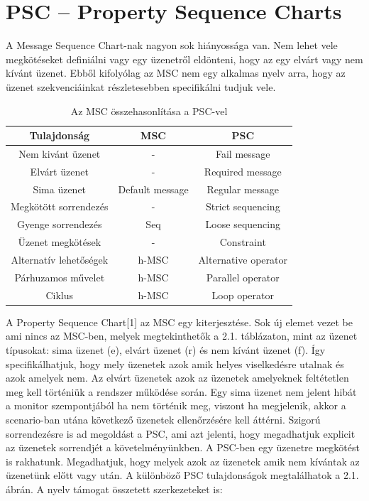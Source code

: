 \chapter{PSC – Property Sequence Charts}
A Message Sequence Chart-nak nagyon sok hiányossága van.
Nem lehet vele megkötéseket definiálni vagy egy üzenetről eldönteni, hogy az egy elvárt vagy nem kívánt üzenet.
Ebből kifolyólag az MSC nem egy alkalmas nyelv arra, hogy az üzenet szekvenciáinkat részletesebben specifikálni tudjuk vele.

\begin{table}[ht]
    \centering %
    \begin{tabular}{ |c|c|c| } %
    \hline
    \textbf{Tulajdonság} & \textbf{MSC} & \textbf{PSC} \\ [0.5ex] %
    \hline %
    \hline
    Nem kivánt üzenet & - & Fail message \\ %
    \hline
    Elvárt üzenet & - & Required message \\
    \hline
    Sima üzenet & Default message & Regular message \\
    \hline
    Megkötött sorrendezés & - & Strict sequencing \\
    \hline
    Gyenge sorrendezés & Seq & Loose sequencing \\
    \hline
    Üzenet megkötések & - & Constraint \\
    \hline
    Alternatív lehetőségek & h-MSC & Alternative operator \\
    \hline
    Párhuzamos művelet & h-MSC & Parallel operator \\
    \hline
    Ciklus & h-MSC & Loop operator \\
    \hline %
    \end{tabular}
    \label{table:nonlin} %
    \caption{Az MSC összehasonlítása a PSC-vel} %
\end{table}

A Property Sequence Chart[1] az MSC egy kiterjesztése.
Sok új elemet vezet be ami nincs az MSC-ben, melyek megtekinthetők a 2.1. táblázaton, mint az üzenet típusokat: sima üzenet (e), elvárt üzenet (r) és nem kívánt üzenet (f).
Így specifikálhatjuk, hogy mely üzenetek azok amik helyes viselkedésre utalnak és azok amelyek nem.
Az elvárt üzenetek azok az üzenetek amelyeknek feltétetlen meg kell történiük a rendszer működése során.
Egy sima üzenet nem jelent hibát a monitor szempontjából ha nem történik meg, viszont ha megjelenik, akkor a scenario-ban utána következő üzenetek ellenőrzésére kell áttérni.
Szigorú sorrendezésre is ad megoldást a PSC, ami azt jelenti, hogy megadhatjuk explicit az üzenetek sorrendjét a követelményünkben.
A PSC-ben egy üzenetre megkötést is rakhatunk.
Megadhatjuk, hogy melyek azok az üzenetek amik nem kívántak az üzenetünk előtt vagy után.
A különböző PSC tulajdonságok megtalálhatok a 2.1. ábrán.
A nyelv támogat összetett szerkezeteket is:

